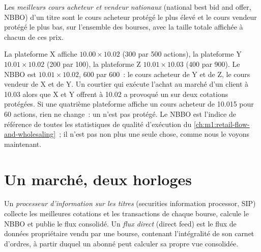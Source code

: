 \begin{definition}\label{def:m1:us-equity-market-structure:nbbo}
Les \emph{meilleurs cours acheteur et vendeur nationaux}
(national best bid and offer, NBBO) d'un titre sont le cours acheteur protégé le plus élevé et le cours vendeur protégé le
plus bas, sur l'ensemble des bourses, avec la taille totale affichée à chacun de ces
prix.
\end{definition}

\begin{example}\label{ex:m1:us-equity-market-structure:nbbo}
La plateforme X affiche $10.00 \times 10.02$ (300 par 500 actions), la plateforme Y $10.01
\times 10.02$ (200 par 100), la plateforme Z $10.01 \times 10.03$ (400 par 900). Le
NBBO est $10.01 \times 10.02$, 600 par 600~: le cours acheteur de Y et de Z, le cours vendeur
de X et de Y. Un courtier qui exécute l'achat au marché d'un client à 10.03 alors que
X et Y offrent à 10.02 a provoqué un  sur deux cotations protégées. Si une
quatrième plateforme affiche un cours acheteur de 10.015 pour 60 actions, rien ne
change~: un  n'est pas protégé. Le NBBO est l'indice de référence de toutes les
statistiques de qualité d'exécution du \cref{ch:m1:retail-flow-and-wholesaling}~; il n'est
pas non plus une seule chose, comme nous le voyons maintenant.
\end{example}

\section{Un marché, deux horloges}

\begin{definition}\label{def:m1:us-equity-market-structure:sip}
Un \emph{processeur d'information sur les titres}
(securities information processor, SIP) collecte les meilleures cotations et les transactions de chaque bourse, calcule le
NBBO et publie le flux consolidé. Un
\emph{flux direct} (direct feed) est le flux de données propriétaire vendu par
une bourse, contenant l'intégralité de son carnet d'ordres, à partir duquel un abonné peut
calculer sa propre vue consolidée.
\end{definition}

